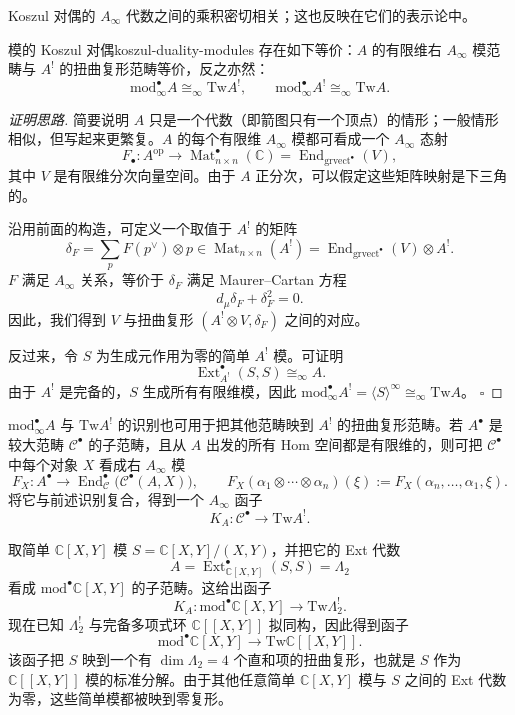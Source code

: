 Koszul 对偶的 $A_\infty$ 代数之间的乘积密切相关；这也反映在它们的表示论中。

\begin{theorem}{模的 Koszul 对偶}{koszul-duality-modules}
存在如下等价：$A$ 的有限维右 $A_\infty$ 模范畴与 $A^!$ 的扭曲复形范畴等价，反之亦然：
\[
  \mathrm{mod}_{\infty}^{\bullet}A\cong_\infty\mathrm{Tw}A^!,\qquad
  \mathrm{mod}_{\infty}^{\bullet}A^!\cong_\infty\mathrm{Tw}A.
\]
\end{theorem}
\begin{proof}[证明思路]
简要说明 $A$ 只是一个代数（即箭图只有一个顶点）的情形；一般情形相似，但写起来更繁复。$A$ 的每个有限维 $A_\infty$ 模都可看成一个 $A_\infty$ 态射
\[
  F_{\bullet}:A^{\mathrm{op}}\to\operatorname{Mat}_{n\times n}^{\bullet}(\mathbb C)
  =\operatorname{End}_{\mathrm{grvect}^{\bullet}}(V),
\]
其中 $V$ 是有限维分次向量空间。由于 $A$ 正分次，可以假定这些矩阵映射是下三角的。

沿用前面的构造，可定义一个取值于 $A^!$ 的矩阵
\[
  \delta_F=\sum_p F(p^\vee)\otimes p
  \in\operatorname{Mat}_{n\times n}(A^!)
  =\operatorname{End}_{\mathrm{grvect}^{\bullet}}(V)\otimes A^!.
\]
$F$ 满足 $A_\infty$ 关系，等价于 $\delta_F$ 满足 Maurer--Cartan 方程
\[
  d_\mu\delta_F+\delta_F^2=0.
\]
因此，我们得到 $V$ 与扭曲复形 $(A^!\otimes V,\delta_F)$ 之间的对应。

反过来，令 $S$ 为生成元作用为零的简单 $A^!$ 模。可证明
\[
  \operatorname{Ext}^{\bullet}_{A^!}(S,S)\cong_\infty A.
\]
由于 $A^!$ 是完备的，$S$ 生成所有有限维模，因此 $\mathrm{mod}_{\infty}^{\bullet}A^!=\langle S\rangle^{\infty}\cong_\infty\mathrm{Tw}A$。
\hfill$\square$
\end{proof}

$\mathrm{mod}_{\infty}^{\bullet}A$ 与 $\mathrm{Tw}A^!$ 的识别也可用于把其他范畴映到 $A^!$ 的扭曲复形范畴。若 $A^{\bullet}$ 是较大范畴 $\mathcal C^{\bullet}$ 的子范畴，且从 $A$ 出发的所有 Hom 空间都是有限维的，则可把 $\mathcal C^{\bullet}$ 中每个对象 $X$ 看成右 $A_\infty$ 模
\[
  F_X:A^{\bullet}\to\operatorname{End}^{\bullet}_{\mathcal C}
  \bigl(\mathcal C^{\bullet}(A,X)\bigr),\qquad
  F_X(\alpha_1\otimes\cdots\otimes\alpha_n)(\xi)
  :=F_X(\alpha_n,\ldots,\alpha_1,\xi).
\]
将它与前述识别复合，得到一个 $A_\infty$ 函子
\[
  K_A:\mathcal C^{\bullet}\longrightarrow\mathrm{Tw}A^!.
\]

\begin{example}[点模的像]
取简单 $\mathbb C[X,Y]$ 模 $S=\mathbb C[X,Y]/(X,Y)$，并把它的 Ext 代数
\[
  A=\operatorname{Ext}^{\bullet}_{\mathbb C[X,Y]}(S,S)=\Lambda_2
\]
看成 $\mathrm{mod}^{\bullet}\mathbb C[X,Y]$ 的子范畴。这给出函子
\[
  K_A:\mathrm{mod}^{\bullet}\mathbb C[X,Y]\to\mathrm{Tw}\Lambda_2^!.
\]
现在已知 $\Lambda_2^!$ 与完备多项式环 $\mathbb C[[X,Y]]$ 拟同构，因此得到函子
\[
  \mathrm{mod}^{\bullet}\mathbb C[X,Y]\longrightarrow\mathrm{Tw}\mathbb C[[X,Y]].
\]
该函子把 $S$ 映到一个有 $\dim\Lambda_2=4$ 个直和项的扭曲复形，也就是 $S$ 作为 $\mathbb C[[X,Y]]$ 模的标准分解。由于其他任意简单 $\mathbb C[X,Y]$ 模与 $S$ 之间的 Ext 代数为零，这些简单模都被映到零复形。
\end{example}

